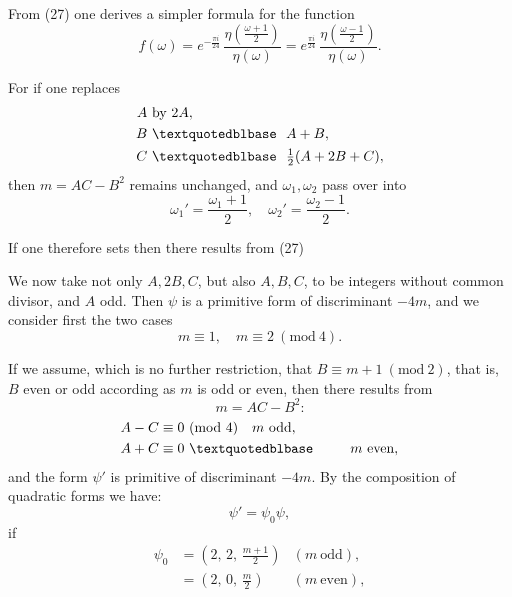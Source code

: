 
From (27) one derives a simpler formula for the function
\[
f(\omega) = e^{-\frac{\pi i}{24}}\,\frac{\eta\!\left(\frac{\omega+1}{2}\right)}{\eta(\omega)} = e^{\frac{\pi i}{24}}\,\frac{\eta\!\left(\frac{\omega-1}{2}\right)}{\eta(\omega)}.
\]

For if one replaces
\[
\begin{aligned}
A &\ \text{by}\ 2A,\\
B &\ \text{\textquotedblbase}\ \ A+B,\\
C &\ \text{\textquotedblbase}\ \ \tfrac12(A+2B+C),
\end{aligned}
\]
then $m=AC-B^2$ remains unchanged, and $\omega_1,\omega_2$ pass over into
\[
\omega_1' = \frac{\omega_1+1}{2},\quad \omega_2' = \frac{\omega_2-1}{2}.
\]

If one therefore sets
then there results from (27)

We now take not only $A, 2B, C$, but also $A, B, C$, to be integers without common divisor, and $A$ odd. Then $\psi$ is a primitive form of discriminant $-4m$, and we consider first the two cases
\[
m\equiv 1,\quad m\equiv 2\ (\mathrm{mod}\ 4).
\]

If we assume, which is no further restriction, that $B\equiv m+1\ (\mathrm{mod}\ 2)$, that is, $B$ even or odd according as $m$ is odd or even, then there results from
\[
m = AC-B^2\text{:}
\]
\[
\begin{aligned}
A-C&\equiv 0\ (\mathrm{mod}\ 4) \quad m\ \text{odd},\\
A+C&\equiv 0\ \text{\textquotedblbase} \qquad\ \ m\ \text{even},
\end{aligned}
\]
and the form $\psi'$ is primitive of discriminant $-4m$. By the composition of quadratic forms we have:
\[
\psi' = \psi_0\psi,
\]
if
\[
\begin{aligned}
\psi_0 &= \left(2,\,2,\,\tfrac{m+1}{2}\right) & (m\ \text{odd}),\\
&= \left(2,\,0,\,\tfrac{m}{2}\right) & (m\ \text{even}),
\end{aligned}
\]
